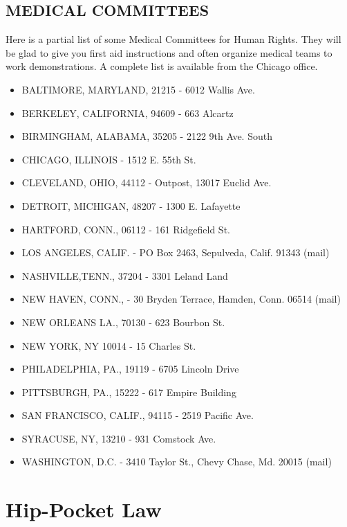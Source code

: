 \documentclass[11pt,twoside,a4paper]{book}
\begin{document}
\subsection{MEDICAL COMMITTEES}
	Here is a partial list of some Medical Committees for Human Rights. They will be glad to give you first aid instructions and often organize medical teams to work demonstrations. A complete list is available from the Chicago office.~\\
\begin{itemize}
\item BALTIMORE, MARYLAND, 21215 - 6012 Wallis Ave. 
\item BERKELEY, CALIFORNIA, 94609 - 663 Alcartz 
\item BIRMINGHAM, ALABAMA, 35205 - 2122 9th Ave. South 
\item CHICAGO, ILLINOIS - 1512 E. 55th St. 
\item CLEVELAND, OHIO, 44112 - Outpost, 13017 Euclid Ave. 
\item DETROIT, MICHIGAN, 48207 - 1300 E. Lafayette 
\item HARTFORD, CONN., 06112 - 161 Ridgefield St. 
\item LOS ANGELES, CALIF. - PO Box 2463, Sepulveda, Calif. 91343 (mail) 
\item NASHVILLE,TENN., 37204 - 3301 Leland Land 
\item NEW HAVEN, CONN., - 30 Bryden Terrace, Hamden, Conn. 06514 (mail) 
\item NEW ORLEANS LA., 70130 - 623 Bourbon St.
\item NEW YORK, NY 10014 - 15 Charles St. 
\item PHILADELPHIA, PA., 19119 - 6705 Lincoln Drive 
\item PITTSBURGH, PA., 15222 - 617 Empire Building 
\item SAN FRANCISCO, CALIF., 94115 - 2519 Pacific Ave. 
\item SYRACUSE, NY, 13210 - 931 Comstock Ave. 
\item WASHINGTON, D.C. - 3410 Taylor St., Chevy Chase, Md. 20015 (mail)
\end{itemize}

\section{Hip-Pocket Law}
\end{document}
